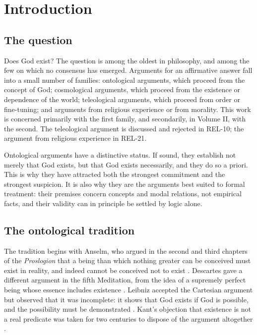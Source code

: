 \documentclass{situationist-preprint}
\begin{document}
\section{Introduction}

\subsection{The question}

Does God exist? The question is among the oldest in philosophy, and among the few on which no consensus has emerged. Arguments for an affirmative answer fall into a small number of families: ontological arguments, which proceed from the concept of God; cosmological arguments, which proceed from the existence or dependence of the world; teleological arguments, which proceed from order or fine-tuning; and arguments from religious experience or from morality. This work is concerned primarily with the first family, and secondarily, in Volume II, with the second. The teleological argument is discussed and rejected in REL-10; the argument from religious experience in REL-21.

Ontological arguments have a distinctive status. If sound, they establish not merely that God exists, but that God exists necessarily, and they do so a priori. This is why they have attracted both the strongest commitment and the strongest suspicion. It is also why they are the arguments best suited to formal treatment: their premises concern concepts and modal relations, not empirical facts, and their validity can in principle be settled by logic alone.

\subsection{The ontological tradition}

The tradition begins with Anselm, who argued in the second and third chapters of the \emph{Proslogion} that a being than which nothing greater can be conceived must exist in reality, and indeed cannot be conceived not to exist \citep{Anselm}. Descartes gave a different argument in the fifth Meditation, from the idea of a supremely perfect being whose essence includes existence \citep{Descartes}. Leibniz accepted the Cartesian argument but observed that it was incomplete: it shows that God exists if God is possible, and the possibility must be demonstrated \citep{Leibniz}. Kant's objection that existence is not a real predicate was taken for two centuries to dispose of the argument altogether \citep{Kant}.
\end{document}
